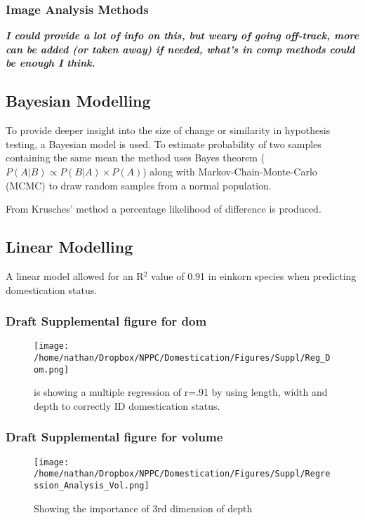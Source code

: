 \documentclass[a4paper]{article}
\begin{document}
\subsubsection{Image Analysis Methods}
\label{sec:org84dfb69}
\textbf{\emph{I could provide a lot of info on this, but weary of going off-track, more can be added (or taken away) if needed, what's in comp methods could be enough I think.}}

\subsection{Bayesian Modelling}
\label{sec:orgabcb0fd}
To provide deeper insight into the size of change or similarity in hypothesis testing, a Bayesian model is used. To estimate probability of two samples containing the same mean the method uses Bayes theorem (\(P(A|B) \propto P(B|A) \times P(A)\)) \cite{Kruschke2012} along with Markov-Chain-Monte-Carlo (MCMC) to draw random samples from a normal population.

From Krusches' method a percentage likelihood of difference is produced.

\subsection{Linear Modelling}
\label{sec:orgf1d6972}

A linear model allowed for an R\(^{\text{2}}\) value of 0.91 in einkorn species when predicting domestication status.

\subsubsection{Draft Supplemental figure for dom}
\label{sec:org31bd52c}

\begin{figure}[htbp]
\centering
\texttt{[image: /home/nathan/Dropbox/NPPC/Domestication/Figures/Suppl/Reg\_Dom.png]}
\caption{\label{fig:orge81711e}
is showing a multiple regression of r=.91 by using length, width and depth to correctly ID domestication status.}
\end{figure}


\subsubsection{Draft Supplemental figure for volume}
\label{sec:orgaa95095}
\begin{figure}[htbp]
\centering
\texttt{[image: /home/nathan/Dropbox/NPPC/Domestication/Figures/Suppl/Regression\_Analysis\_Vol.png]}
\caption{\label{fig:org68e6e98}
Showing the importance of 3rd dimension of depth}
\end{figure}
\end{document}
